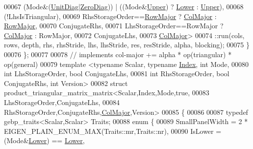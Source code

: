 \begin{DoxyCode}
00067       (Mode&(\hyperlink{group__enums_gga39e3366ff5554d731e7dc8bb642f83cdaddb72f888ac85d5a1c52333e54f9374b}{UnitDiag}|\hyperlink{group__enums_gga39e3366ff5554d731e7dc8bb642f83cda884ff7240392e85aa6e4b3c957e36483}{ZeroDiag})) | ((Mode&\hyperlink{group__enums_gga39e3366ff5554d731e7dc8bb642f83cda6bcb58be3b8b8ec84859ce0c5ac0aaec}{Upper}) ? \hyperlink{group__enums_gga39e3366ff5554d731e7dc8bb642f83cda891792b8ed394f7607ab16dd716f60e6}{Lower} : 
      \hyperlink{group__enums_gga39e3366ff5554d731e7dc8bb642f83cda6bcb58be3b8b8ec84859ce0c5ac0aaec}{Upper}),
00068       (!LhsIsTriangular),
00069       RhsStorageOrder==\hyperlink{group__enums_ggaacded1a18ae58b0f554751f6cdf9eb13acfcde9cd8677c5f7caf6bd603666aae3}{RowMajor} ? \hyperlink{group__enums_ggaacded1a18ae58b0f554751f6cdf9eb13a0cbd4bdd0abcfc0224c5fcb5e4f6669a}{ColMajor} : \hyperlink{group__enums_ggaacded1a18ae58b0f554751f6cdf9eb13acfcde9cd8677c5f7caf6bd603666aae3}{RowMajor},
00070       ConjugateRhs,
00071       LhsStorageOrder==RowMajor ? \hyperlink{group__enums_ggaacded1a18ae58b0f554751f6cdf9eb13a0cbd4bdd0abcfc0224c5fcb5e4f6669a}{ColMajor} : RowMajor,
00072       ConjugateLhs,
00073       \hyperlink{group__enums_ggaacded1a18ae58b0f554751f6cdf9eb13a0cbd4bdd0abcfc0224c5fcb5e4f6669a}{ColMajor}>
00074       ::run(cols, rows, depth, rhs, rhsStride, lhs, lhsStride, res, resStride, alpha, blocking);
00075   \}
00076 \};
00077 
00078 \textcolor{comment}{// implements col-major += alpha * op(triangular) * op(general)}
00079 \textcolor{keyword}{template} <\textcolor{keyword}{typename} Scalar, \textcolor{keyword}{typename} \hyperlink{namespace_eigen_a62e77e0933482dafde8fe197d9a2cfde}{Index}, \textcolor{keywordtype}{int} Mode,
00080           \textcolor{keywordtype}{int} LhsStorageOrder, \textcolor{keywordtype}{bool} ConjugateLhs,
00081           \textcolor{keywordtype}{int} RhsStorageOrder, \textcolor{keywordtype}{bool} ConjugateRhs, \textcolor{keywordtype}{int} Version>
00082 \textcolor{keyword}{struct }product\_triangular\_matrix\_matrix<Scalar,Index,Mode,true,
00083                                            LhsStorageOrder,ConjugateLhs,
00084                                            RhsStorageOrder,ConjugateRhs,\hyperlink{group__enums_ggaacded1a18ae58b0f554751f6cdf9eb13a0cbd4bdd0abcfc0224c5fcb5e4f6669a}{ColMajor},Version>
00085 \{
00086   
00087   \textcolor{keyword}{typedef} gebp\_traits<Scalar,Scalar> Traits;
00088   \textcolor{keyword}{enum} \{
00089     SmallPanelWidth   = 2 * EIGEN\_PLAIN\_ENUM\_MAX(Traits::mr,Traits::nr),
00090     IsLower = (Mode&\hyperlink{group__enums_gga39e3366ff5554d731e7dc8bb642f83cda891792b8ed394f7607ab16dd716f60e6}{Lower}) == \hyperlink{group__enums_gga39e3366ff5554d731e7dc8bb642f83cda891792b8ed394f7607ab16dd716f60e6}{Lower},

\end{DoxyCode}
